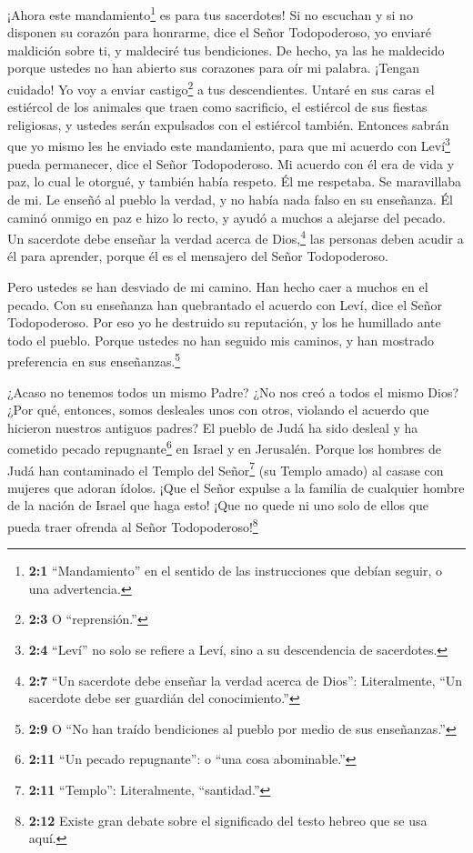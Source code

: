  ¡Ahora este mandamiento\footnote{\textbf{2:1}
  ``Mandamiento'' en el sentido de las instrucciones que debían seguir,
  o una advertencia.} es para tus sacerdotes!  Si no
escuchan y si no disponen su corazón para honrarme, dice el Señor
Todopoderoso, yo enviaré maldición sobre ti, y maldeciré tus
bendiciones. De hecho, ya las he maldecido porque ustedes no han abierto
sus corazones para oír mi palabra.  ¡Tengan cuidado! Yo voy
a enviar castigo\footnote{\textbf{2:3} O ``reprensión.''} a tus
descendientes. Untaré en sus caras el estiércol de los animales que
traen como sacrificio, el estiércol de sus fiestas religiosas, y ustedes
serán expulsados con el estiércol también.  Entonces sabrán
que yo mismo les he enviado este mandamiento, para que mi acuerdo con
Leví\footnote{\textbf{2:4} ``Leví'' no solo se refiere a Leví, sino a su
  descendencia de sacerdotes.} pueda permanecer, dice el Señor
Todopoderoso.  Mi acuerdo con él era de vida y paz, lo cual
le otorgué, y también había respeto. Él me respetaba. Se maravillaba de
mi.  Le enseñó al pueblo la verdad, y no había nada falso en
su enseñanza. Él caminó onmigo en paz e hizo lo recto, y ayudó a muchos
a alejarse del pecado.  Un sacerdote debe enseñar la verdad
acerca de Dios,\footnote{\textbf{2:7} ``Un sacerdote debe enseñar la
  verdad acerca de Dios'': Literalmente, ``Un sacerdote debe ser
  guardián del conocimiento.''} las personas deben acudir a él para
aprender, porque él es el mensajero del Señor Todopoderoso.

 Pero ustedes se han desviado de mi camino. Han hecho caer a
muchos en el pecado. Con su enseñanza han quebrantado el acuerdo con
Leví, dice el Señor Todopoderoso.  Por eso yo he destruido
su reputación, y los he humillado ante todo el pueblo. Porque ustedes no
han seguido mis caminos, y han mostrado preferencia en sus
enseñanzas.\footnote{\textbf{2:9} O ``No han traído bendiciones al
  pueblo por medio de sus enseñanzas.''}

 ¿Acaso no tenemos todos un mismo Padre? ¿No nos creó a
todos el mismo Dios? ¿Por qué, entonces, somos desleales unos con otros,
violando el acuerdo que hicieron nuestros antiguos padres? 
El pueblo de Judá ha sido desleal y ha cometido pecado
repugnante\footnote{\textbf{2:11} ``Un pecado repugnante'': o ``una cosa
  abominable.''} en Israel y en Jerusalén. Porque los hombres de Judá
han contaminado el Templo del Señor\footnote{\textbf{2:11} ``Templo'':
  Literalmente, ``santidad.''} (su Templo amado) al casase con mujeres
que adoran ídolos.  ¡Que el Señor expulse a la familia de
cualquier hombre de la nación de Israel que haga esto! ¡Que no quede ni
uno solo de ellos que pueda traer ofrenda al Señor
Todopoderoso!\footnote{\textbf{2:12} Existe gran debate sobre el
  significado del testo hebreo que se usa aquí.}

